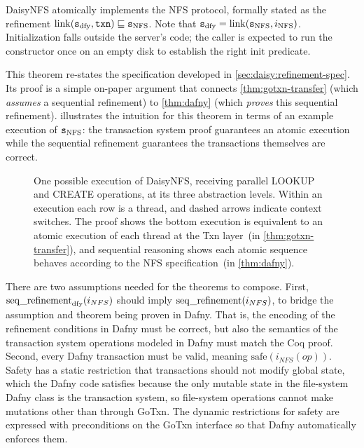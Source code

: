 \begin{theorem}
  DaisyNFS atomically implements the NFS protocol, formally stated as the
  refinement $\mathrm{link}(\texttt{s}_{\mathrm{dfy}}, \texttt{txn}) \sqsubseteq \texttt{s}_{\mathrm{NFS}}$. Note that
  $\texttt{s}_{\mathrm{dfy}} = \mathrm{link}(\texttt{s}_{\mathrm{NFS}}, i_{\mathrm{NFS}})$. Initialization falls outside the
  server's code; the caller is expected to run the  constructor once on
  an empty disk to establish the right $\mathrm{init}$ predicate.
  \label{thm:daisy-correctness}
\end{theorem}

This theorem re-states the specification developed in
\cref{sec:daisy:refinement-spec}. Its proof is a simple on-paper argument that
connects \cref{thm:gotxn-transfer} (which \emph{assumes} a sequential
refinement) to \cref{thm:dafny} (which \emph{proves} this sequential refinement).
 illustrates
the intuition for this theorem in terms of an example execution of $\texttt{s}_{\mathrm{NFS}}$: the transaction system proof guarantees an
atomic execution while the sequential refinement guarantees the transactions
themselves are correct.

\begin{figure}
  \begin{center}
  
  \end{center}
  \caption[One execution of DaisyNFS at its three abstraction levels]{One possible execution of DaisyNFS, receiving parallel LOOKUP and
    CREATE operations, at its three abstraction levels.
    Within an execution each row is a thread, and dashed arrows indicate
    context switches.
    The proof shows the bottom execution is equivalent to an atomic execution of
    each thread at
    the Txn layer~(in \cref{thm:gotxn-transfer}),
    and sequential reasoning shows each atomic sequence behaves according to the NFS
    specification~(in \cref{thm:dafny}).}
  \label{fig:refinement-execs}
\end{figure}

There are two assumptions needed for the theorems to compose. First,
$\operatorname{seq\_refinement}_{\mathrm{dfy}}(i_{NFS})$ should imply $\operatorname{seq\_refinement}(i_{NFS})$,
to bridge the assumption and theorem being proven in Dafny. That is, the
encoding of the refinement conditions in Dafny must be correct, but also the
semantics of the transaction system operations modeled in Dafny must match the
Coq proof. Second, every Dafny transaction must be valid, meaning
$\mathrm{safe}(i_{NFS}(op))$. Safety has a static restriction that transactions
should not modify global state, which the Dafny code satisfies because the only
mutable state in the file-system Dafny class is the transaction system, so
file-system operations cannot make mutations other than through GoTxn. The
dynamic restrictions for safety are expressed with preconditions on the GoTxn
interface so that Dafny automatically enforces them.

